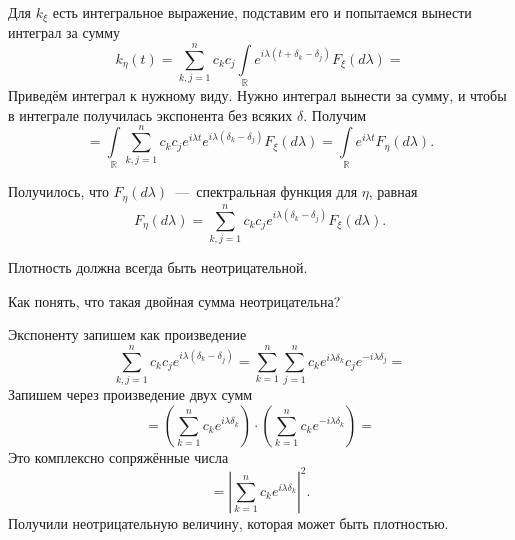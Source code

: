 Для $k_{ \xi }$ есть интегральное выражение, подставим его и попытаемся вынести интеграл за сумму
\begin{equation*}
  k_{ \eta } \left( t \right) =
  \sum \limits_{k, j = 1}^n
    c_k c_j \int \limits_{ \mathbb{R}}
      e^{i \lambda \left( t + \delta_k - \delta_j \right) } F_{ \xi } \left( d \lambda \right) =
\end{equation*}
Приведём интеграл к нужному виду.
Нужно интеграл вынести за сумму, и чтобы в интеграле получилась экспонента без всяких $ \delta $.
Получим
\begin{equation*}
  = \int \limits_{ \mathbb{R}}
      \sum \limits_{k, j = 1}^n
        c_k c_j e^{i \lambda t} e^{i \lambda \left( \delta_k - \delta_j \right) }
    F_{ \xi } \left( d \lambda \right) =
  \int \limits_{ \mathbb{R}} e^{i \lambda t} F_{ \eta } \left( d \lambda \right).
\end{equation*}

Получилось, что $F_{ \eta } \left( d \lambda \right) $~---~спектральная функция для $ \eta $, равная
\begin{equation*}
  F_{ \eta } \left( d \lambda \right) =
  \sum \limits_{k, j = 1}^n
    c_k c_j e^{i \lambda \left( \delta_k - \delta_j \right) } F_{ \xi } \left( d \lambda \right).
\end{equation*}

Плотность должна всегда быть неотрицательной.

Как понять, что такая двойная сумма неотрицательна?

Экспоненту запишем как произведение
\begin{equation*}
  \sum \limits_{k, j = 1}^n c_k c_j e^{i \lambda \left( \delta_k - \delta_j \right) } =
  \sum \limits_{k = 1}^n
    \sum \limits_{j = 1}^n c_k e^{i \lambda \delta_k} c_j e^{-i \lambda \delta_j} =
\end{equation*}
Запишем через произведение двух сумм
\begin{equation*}
  = \left( \sum \limits_{k = 1}^n c_k e^{i \lambda \delta_k} \right) \cdot
  \left( \sum \limits_{k = 1}^n c_k e^{-i \lambda \delta_k} \right) =
\end{equation*}
Это комплексно сопряжённые числа
\begin{equation*}
  = \left| \sum \limits_{k = 1}^n c_k e^{i \lambda \delta_k} \right|^2.
\end{equation*}
Получили неотрицательную величину, которая может быть плотностью.
